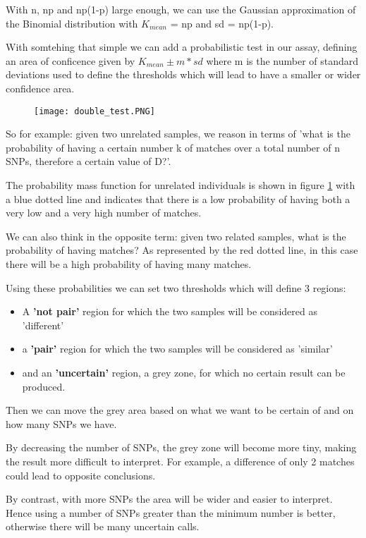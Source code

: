 With n, np and np(1-p) large enough, we can use the Gaussian approximation of the Binomial distribution with $K_{mean}$ = np and sd = np(1-p).

With somtehing that simple we can add a probabilistic test in our assay, defining an area of conficence given by $K_{mean} \pm m * sd$ where m is the number of standard deviations used to define the thresholds which will lead to have a smaller or wider confidence area.

\begin{figure}[H]
	\texttt{[image: double\_test.PNG]}
	\caption{\label{fig:prob_test}}
\end{figure}

\bigskip
So for example: given two unrelated samples, we reason in terms of 'what is the probability of having a certain number k of matches over a total number of n SNPs, therefore a certain value of D?'.

The probability mass function for unrelated individuals is shown in figure \ref{fig:prob_test} with a blue dotted line and indicates that there is a low probability of having both a very low and a very high number of matches.

We can also think in the opposite term: given two related samples, what is the probability of having  matches? As represented by the red dotted line, in this case there will be a high probability of having many matches.

Using these probabilities we can set two thresholds which will define 3 regions:
\begin{itemize}
	\item A \textbf{'not pair'} region for which the two samples will be considered as 'different'
 	\item a \textbf{'pair'} region for which the two samples will be considered as 'similar'
	\item and an \textbf{'uncertain'} region, a grey zone, for which no certain result can be produced.
\end{itemize}

Then we can move the grey area based on what we want to be certain of and on how many SNPs we have.

By decreasing the number of SNPs, the grey zone will become more tiny, making the result more difficult to interpret. For example, a difference of only 2 matches could lead to opposite conclusions.

By contrast, with more SNPs the area will be wider and easier to interpret. Hence using a number of SNPs greater than the minimum number is better, otherwise there will be many uncertain calls.


